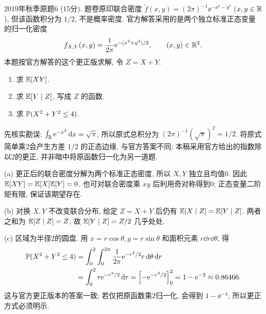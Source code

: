 \begin{exercise}\label{m2:2019f:q6}
2019年秋季原题6 (15分). 题卷原印联合密度 $\widetilde f(x,y)=(2\pi)^{-1}\ee^{-x^2-y^2}$ ($x,y\in\mathbb R$), 但该函数积分为 $1/2$, 不是概率密度. 官方解答采用的是两个独立标准正态变量的归一化密度
\[
f_{X,Y}(x,y)=\frac1{2\pi}\mathrm e^{-(x^2+y^2)/2},\qquad(x,y)\in\mathbb R^2.
\]
本题按官方解答的这个更正版求解, 令 $Z=X+Y$.
\begin{enumerate}
\item[(a)]\label{m2:2019f:q6:a} 求 $\mathbb E[XY]$.
\item[(b)]\label{m2:2019f:q6:b} 求 $\mathbb E[Y\mid Z]$, 写成 $Z$ 的函数.
\item[(c)]\label{m2:2019f:q6:c} 求 $\mathbb P(X^2+Y^2\le4)$.
\end{enumerate}
\end{exercise}
\begin{solution}
先核实勘误: $\int_{\mathbb R}\mathrm e^{-x^2}\,\mathrm d x=\sqrt\pi$, 所以原式总积分为 $(2\pi)^{-1}(\sqrt\pi)^2=1/2$. 将原式简单乘2会产生方差 $1/2$ 的正态边缘, 与官方答案不同; 本稿采用官方给出的指数除以2的更正, 并非暗中将原函数归一化为另一道题.

(a) 更正后的联合密度分解为两个标准正态密度, 所以 $X,Y$ 独立且均值0. 因此 $\mathbb E[XY]=\mathbb E[X]\mathbb E[Y]=0$. 也可对联合密度乘 $xy$ 后利用奇对称得到0; 正态变量二阶矩有限, 保证该期望存在.

(b) 对换 $X,Y$ 不改变联合分布, 给定 $Z=X+Y$ 后仍有 $\mathbb E[X\mid Z]=\mathbb E[Y\mid Z]$. 两者之和为 $\mathbb E[Z\mid Z]=Z$, 故 $\mathbb E[Y\mid Z]=Z/2$ 几乎处处.

(c) 区域为半径2的圆盘. 用 $x=r\cos\theta,y=r\sin\theta$ 和面积元素 $r\dd r\dd\theta$, 得
\begin{align*}
\mathbb P(X^2+Y^2\le4)
&=\int_0^2\int_0^{2\pi}\frac1{2\pi}\mathrm e^{-r^2/2}r\,\mathrm d\theta\,\mathrm d r\\
&=\int_0^2r\mathrm e^{-r^2/2}\,\mathrm d r=\left[-\mathrm e^{-r^2/2}\right]_0^2
=1-\mathrm e^{-2}\approx0.86466.
\end{align*}
这与官方更正版本的答案一致; 若仅把原函数乘2归一化, 会得到 $1-\ee^{-4}$, 所以更正方式必须明示.
\end{solution}
